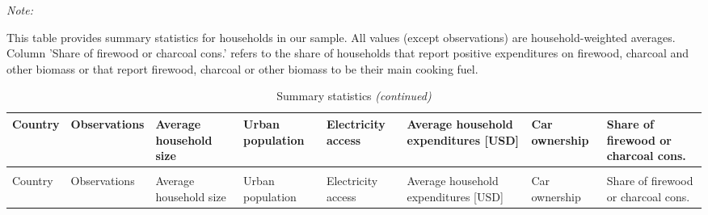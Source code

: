\begingroup\fontsize{9}{11}\selectfont

\begin{ThreePartTable}
\begin{TableNotes}
\item \textit{Note: } 
\item This table provides summary statistics for households in our sample. All values (except observations) are household-weighted averages. Column 'Share of firewood or charcoal cons.' refers to the share of households that report positive expenditures on firewood, charcoal and other biomass or that report firewood, charcoal or other biomass to be their main cooking fuel.
\end{TableNotes}
\begin{longtable}[t]{>{\raggedright\arraybackslash}p{1.7 cm}|>{\raggedleft\arraybackslash}p{1.5 cm}>{\centering\arraybackslash}p{1.5 cm}>{\centering\arraybackslash}p{1.5 cm}>{\centering\arraybackslash}p{1.5 cm}>{\centering\arraybackslash}p{1.5 cm}>{\centering\arraybackslash}p{1.5 cm}>{\centering\arraybackslash}p{1.5 cm}}
\caption{\label{tab:A1}Summary statistics}\\
\toprule
Country & Observations & Average 
household size & Urban 
population & Electricity 
access & Average 
household 
expenditures [USD] & Car 
ownership & Share of 
firewood or 
 charcoal cons.\\
\midrule
\endfirsthead
\caption[]{Summary statistics \textit{(continued)}}\\
\toprule
Country & Observations & Average 
household size & Urban 
population & Electricity 
access & Average 
household 
expenditures [USD] & Car 
ownership & Share of 
firewood or 
 charcoal cons.\\
\midrule
\endhead


\end{longtable}
\end{ThreePartTable}
